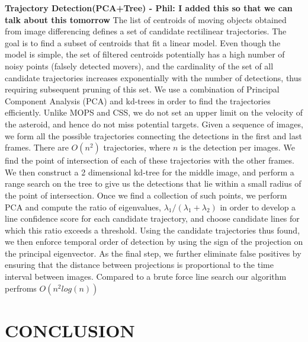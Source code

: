 \documentclass{article}
\begin{document}
{\bf Trajectory Detection(PCA+Tree) - Phil: I added this so that we can talk about this tomorrow}
The list of centroids of moving objects obtained from image differencing defines a set of candidate rectilinear trajectories.  The goal is to find a subset of centroids that fit a linear model. Even though the model is simple, the set of filtered centroids potentially has a high number of noisy points (falsely detected movers), and the cardinality of the set of all candidate trajectories increases exponentially with the number of detections, thus requiring subsequent pruning of this set. We use a combination of Principal Component Analysis (PCA) and kd-trees in order to find the trajectories efficiently. Unlike MOPS and CSS, we do not set an upper limit on the velocity of the asteroid, and hence do not miss potential targets. Given a sequence of images, we form all the possible trajectories connecting the detections in the first and last frames. There are $O(n^2)$ trajectories, where $n$ is the detection per images. We find the point of intersection of each of these trajectories with the other frames. We then construct a 2 dimensional kd-tree for the middle image, and perform a range search on the tree to give us the detections that lie within a small radius of the point of intersection. Once we find a collection of such points, we perform PCA and compute the ratio of eigenvalues, $\lambda_{1}/(\lambda_{1}+ \lambda_{2})$ in order to develop a line confidence score for each candidate trajectory, and choose candidate lines for which this ratio exceeds a threshold. Using the candidate trajectories thus found, we then enforce temporal order of detection by using the sign of the projection on the principal eigenvector.  As the final step, we further eliminate false positives by ensuring that the distance between projections is proportional to the time interval between images. Compared to a brute force line search our algorithm perfroms $O(n^2log(n))$




\section{CONCLUSION}
\end{document}
